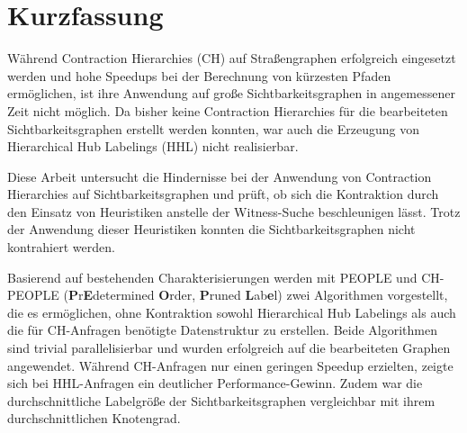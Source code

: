 \chapter*{Kurzfassung}

Während Contraction Hierarchies (CH) auf Straßengraphen erfolgreich eingesetzt werden und hohe Speedups bei der Berechnung von kürzesten Pfaden ermöglichen, ist ihre Anwendung auf große Sichtbarkeitsgraphen in angemessener Zeit nicht möglich.
Da bisher keine Contraction Hierarchies für die bearbeiteten Sichtbarkeitsgraphen erstellt werden konnten, war auch die Erzeugung von Hierarchical Hub Labelings (HHL) nicht realisierbar.

Diese Arbeit untersucht die Hindernisse bei der Anwendung von Contraction Hierarchies auf Sichtbarkeitsgraphen und prüft, ob sich die Kontraktion durch den Einsatz von Heuristiken anstelle der Witness-Suche beschleunigen lässt.
Trotz der Anwendung dieser Heuristiken konnten die Sichtbarkeitsgraphen nicht kontrahiert werden.

Basierend auf bestehenden Charakterisierungen werden mit PEOPLE und CH-PEOPLE (\textbf{P}r\textbf{E}determined \textbf{O}rder, \textbf{P}runed \textbf{L}ab\textbf{e}l) zwei Algorithmen vorgestellt, die es ermöglichen, ohne Kontraktion sowohl Hierarchical Hub Labelings als auch die für CH-Anfragen benötigte Datenstruktur zu erstellen.
Beide Algorithmen sind trivial parallelisierbar und wurden erfolgreich auf die bearbeiteten Graphen angewendet.
Während CH-Anfragen nur einen geringen Speedup erzielten, zeigte sich bei HHL-Anfragen ein deutlicher Performance-Gewinn.
Zudem war die durchschnittliche Labelgröße der Sichtbarkeitsgraphen vergleichbar mit ihrem durchschnittlichen Knotengrad.